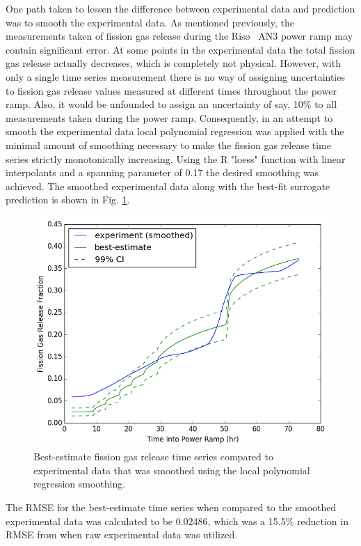 One path taken to lessen the difference between experimental data and prediction was to smooth the experimental data. As mentioned previously, the measurements taken of fission gas release during the Ris\o~ AN3 power ramp may contain significant error. At some points in the experimental data the total fission gas release actually decreases, which is completely not physical. However, with only a single time series measurement there is no way of assigning uncertainties to fission gas release values measured at different times throughout the power ramp. Also, it would be unfounded to assign an uncertainty of say, 10\% to all measurements taken during the power ramp. Consequently, in an attempt to smooth the experimental data local polynomial regression was applied with the minimal amount of smoothing necessary to make the fission gas release time series strictly monotonically increasing. Using the R "loess" function with linear interpolants and a spanning parameter of 0.17 the desired smoothing was achieved. The smoothed experimental data along with the best-fit surrogate prediction is shown in Fig. \ref{fig:best_estimate_smooth}.  
\begin{figure}[!h]
\caption{\label{fig:best_estimate_smooth}
Best-estimate fission gas release time series compared to experimental data that was smoothed using the local polynomial regression smoothing.}
 \begin{center}
  \includegraphics[scale=.75]{./Chapter4/best_estimate_smooth.png}
 \end{center}
\end{figure}
The \ac{RMSE} for the best-estimate time series when compared to the smoothed experimental data was calculated to be 0.02486, which was a 15.5\% reduction in \ac{RMSE} from when raw experimental data was utilized.

